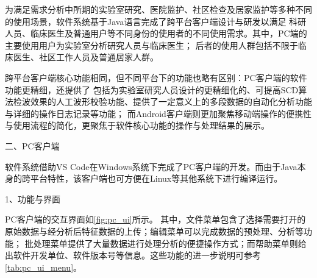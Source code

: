 为满足需求分析中所期的实验室研究、医院监护、社区检查及居家监护等多种不同的使用场景，软件系统基于Java语言完成了跨平台客户端设计与研发以满足
科研人员、临床医生及普通用户等不同身份的使用者的不同使用需求。其中，PC端的主要使用用户为实验室分析研究人员与临床医生；
后者的使用人群包括不限于临床医生、社区工作人员及普通居家人群。

跨平台客户端核心功能相同，但不同平台下的功能也略有区别：PC客户端的软件功能更精细，还提供了
包括为实验室研究人员设计的更精细化的、可提高SCD算法检波效果的人工波形校验功能、提供了一定意义上的多段数据的自动化分析功能与详细的操作日志记录等功能；
而Android客户端则更加聚焦移动端操作的便携性与使用流程的简化，更聚焦于软件核心功能的操作与处理结果的展示。

二、PC客户端

软件系统借助VS Code在Windows系统下完成了PC客户端的开发。而由于Java本身的跨平台特性\cite{openjdk}，该客户端也可方便在Linux等其他系统下进行编译运行。

1、功能与界面

PC客户端的交互界面如\autoref{fig:pc_ui}所示。%
其中，文件菜单包含了选择需要打开的原始数据与经分析后特征数据的上传；编辑菜单可以完成数据的预处理、分析等功能；
批处理菜单提供了大量数据进行处理分析的便捷操作方式；而帮助菜单则给出软件开发单位、软件版本号等信息。这些功能的进一步说明可参考\autoref{tab:pc_ui_menu}。


